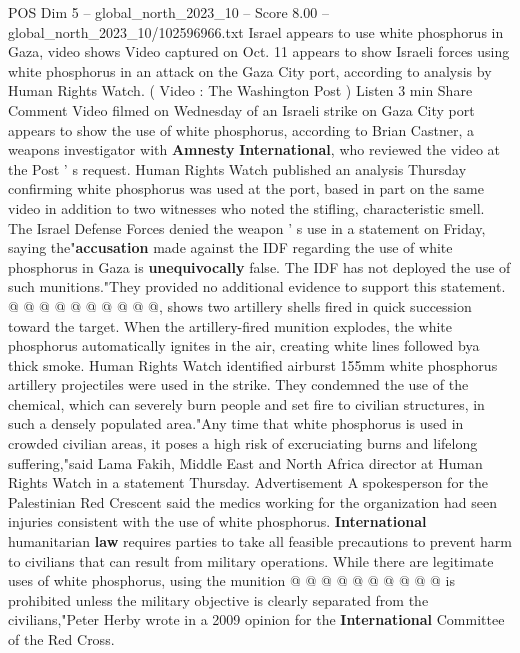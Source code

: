 \begin{textsample}{POS Dim 5 – global\_north\_2023\_10 – Score 8.00 – global\_north\_2023\_10/102596966.txt}  \label{ex:f5_pos_433}
Israel appears to use white phosphorus in Gaza, video shows Video captured on Oct. 11 appears to show Israeli forces using white phosphorus in an attack on the Gaza City port, according to analysis by Human Rights Watch. ( Video : The Washington Post ) Listen 3 min Share Comment Video filmed on Wednesday of an Israeli strike on Gaza City port appears to show the use of white phosphorus, according to Brian Castner, a weapons investigator with \textbf{Amnesty} \textbf{International}, who reviewed the video at the Post ' s request.
Human Rights Watch published an analysis Thursday confirming white phosphorus was used at the port, based in part on the same video in addition to two witnesses who noted the stifling, characteristic smell.
The Israel Defense Forces denied the weapon ' s use in a statement on Friday, saying the"\textbf{accusation} made against the IDF regarding the use of white phosphorus in Gaza is \textbf{unequivocally} false.
The IDF has not deployed the use of such munitions."They provided no additional evidence to support this statement. @ @ @ @ @ @ @ @ @ @, shows two artillery shells fired in quick succession toward the target.
When the artillery-fired munition explodes, the white phosphorus automatically ignites in the air, creating white lines followed bya thick smoke.
Human Rights Watch identified airburst 155mm white phosphorus artillery projectiles were used in the strike.
They condemned the use of the chemical, which can severely burn people and set fire to civilian structures, in such a densely populated area."Any time that white phosphorus is used in crowded civilian areas, it poses a high risk of excruciating burns and lifelong suffering,"said Lama Fakih, Middle East and North Africa director at Human Rights Watch in a statement Thursday.
Advertisement A spokesperson for the Palestinian Red Crescent said the medics working for the organization had seen injuries consistent with the use of white phosphorus. \textbf{International} humanitarian \textbf{law} requires parties to take all feasible precautions to prevent harm to civilians that can result from military operations.
While there are legitimate uses of white phosphorus, using the munition @ @ @ @ @ @ @ @ @ @ is prohibited unless the military objective is clearly separated from the civilians,"Peter Herby wrote in a 2009 opinion for the \textbf{International} Committee of the Red Cross.

\end{textsample}
